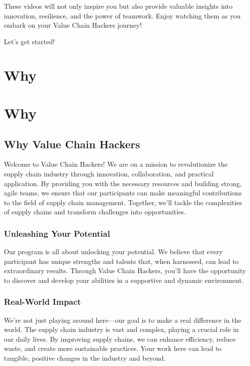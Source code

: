 \documentclass[
  letterpaper,
  DIV=11,
  numbers=noendperiod]{scrreprt}
\begin{document}
These videos will not only inspire you but also provide valuable
insights into innovation, resilience, and the power of teamwork. Enjoy
watching them as you embark on your Value Chain Hackers journey!

Let's get started!


\chapter{Why}\label{why}


\chapter{Why}\label{why-1}

\section{Why Value Chain Hackers}\label{why-value-chain-hackers}

Welcome to Value Chain Hackers! We are on a mission to revolutionize the
supply chain industry through innovation, collaboration, and practical
application. By providing you with the necessary resources and building
strong, agile teams, we ensure that our participants can make meaningful
contributions to the field of supply chain management. Together, we'll
tackle the complexities of supply chains and transform challenges into
opportunities.

\subsection{Unleashing Your Potential}\label{unleashing-your-potential}

Our program is all about unlocking your potential. We believe that every
participant has unique strengths and talents that, when harnessed, can
lead to extraordinary results. Through Value Chain Hackers, you'll have
the opportunity to discover and develop your abilities in a supportive
and dynamic environment.

\subsection{Real-World Impact}\label{real-world-impact}

We're not just playing around here---our goal is to make a real
difference in the world. The supply chain industry is vast and complex,
playing a crucial role in our daily lives. By improving supply chains,
we can enhance efficiency, reduce waste, and create more sustainable
practices. Your work here can lead to tangible, positive changes in the
industry and beyond.
\end{document}
